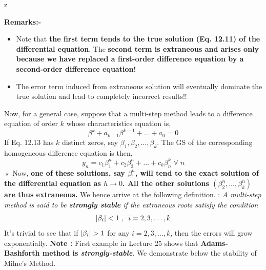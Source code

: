 z\documentclass[a4paper,12pt,twoside]{book}
\newcommand{\nll}[0]{\newline\newline}
\newcommand{\tit}[1]{\textit{#1}}
\newcommand{\defin}[0]{\boxed{\textbf{\textit{Definition}}}}
\DeclarePairedDelimiter\abs{\lvert}{\rvert}
\begin{document}
\textbf{Remarks:-}
\begin{itemize}
    \item {Note that \textbf{the first term tends to the true solution (Eq. 12.11) of the differential equation}. The \textbf{second term is extraneous and arises only because we have replaced a first-order difference equation by a second-order difference equation!}}
    \item{The error term induced from extraneous solution will eventually dominate the true solution and lead to completely incorrect results!!}
\end{itemize}
Now, for a general case, suppose that a multi-step method leads to a difference equation of order $k$ whose characteristics equation is,
\begin{equation}
     \beta^k + a_{k-1}\beta^{k-1} + \dots + a_0 = 0
\end{equation}
If Eq. 12.13 has $k$ distinct zeros, say $\beta_1,\beta_2,\dots,\beta_k$. The GS of the corresponding homogeneous difference equation is then,
\[ y_n = c_1 \beta_1^n + c_2\beta_2^n + \dots + c_k \beta_n^k  \;\forall \; n\]
$\boxed{\star}$ Now, \textbf{one of these solutions, say $\beta_1^n$, will tend to the exact solution of the differential equation as $h\to 0$. All the other solutions $(\beta_2^n,\dots,\beta_k^n)$ are thus extraneous.} We hence arrive at the following definition.
\nll
\defin  : \tit{A multi-step method is said to be \textbf{strongly stable} if the extraneous roots satisfy the condition}
\[ \abs*{\beta_i} < 1\;,\;\;i=2,3,\dots,k \]
It's trivial to see that if $\abs*{\beta_i} > 1$ for any $i=2,3,\dots,k$, then the errors will grow exponentially.
\nll
\textbf{Note : } First example in Lecture 25 shows that \textbf{Adams-Bashforth method is \tit{strongly-stable}}. We demonstrate below the stability of Milne's Method.
\end{document}
